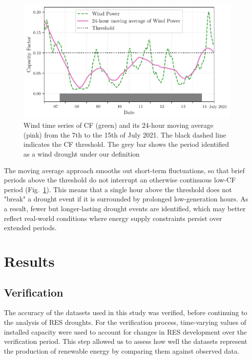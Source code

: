 \documentclass[preprint, 12pt]{elsarticle}
\begin{document}
\begin{figure}[ht!]
	\centering
	\includegraphics[width=\textwidth]{droughts_methodology.pdf}
	\caption{Wind time series of CF (green) and its 24-hour moving average (pink) from the 7th to the 15th of July 2021. The black dashed line indicates the CF threshold. The grey bar shows the period identified as a wind drought under our definition}
	\label{fig:find_res_droughts}
\end{figure}

The moving average approach smooths out short-term fluctuations, so that brief periods above the threshold do not interrupt an otherwise continuous low-CF period (Fig.~\ref{fig:find_res_droughts}). This means that a single hour above the threshold does not "break" a drought event if it is surrounded by prolonged low-generation hours. As a result, fewer but longer-lasting drought events are identified, which may better reflect real-world conditions where energy supply constraints persist over extended periods.

\section{Results}
\label{sec:results}

\subsection{Verification}
\label{sec:verification}

The accuracy of the datasets used in this study was verified, before continuing to the analysis of RES droughts. For the verification process, time-varying values of installed capacity were used to account for changes in RES development over the verification period. This step allowed us to assess how well the datasets represent the production of renewable energy by comparing them against observed data.
\end{document}
